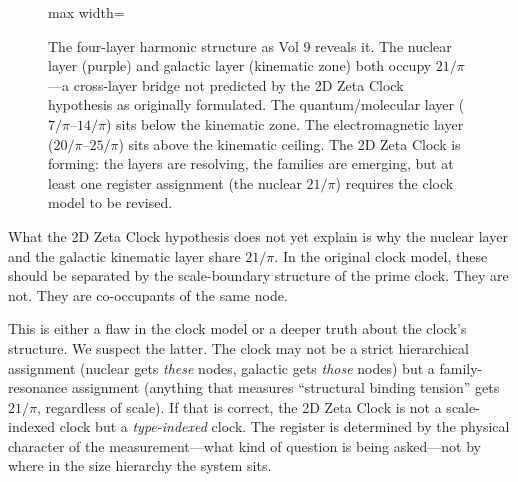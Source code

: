 \documentclass[11pt, letterpaper, openany]{book}
\begin{document}
\begin{figure}[H]
\begin{adjustbox}{max width=\textwidth}
\end{adjustbox}
\caption{The four-layer harmonic structure as Vol 9 reveals it. The nuclear layer
(purple) and galactic layer (kinematic zone) both occupy $21/\pi$---a cross-layer
bridge not predicted by the 2D Zeta Clock hypothesis as originally formulated.
The quantum/molecular layer ($7/\pi$--$14/\pi$) sits below the kinematic zone.
The electromagnetic layer ($20/\pi$--$25/\pi$) sits above the kinematic ceiling.
The 2D Zeta Clock is forming: the layers are resolving, the families are emerging,
but at least one register assignment (the nuclear $21/\pi$) requires the clock
model to be revised.}
\label{fig:four_layer}
\end{figure}

What the 2D Zeta Clock hypothesis does not yet explain is why the nuclear layer
and the galactic kinematic layer share $21/\pi$. In the original clock model,
these should be separated by the scale-boundary structure of the prime clock.
They are not. They are co-occupants of the same node.

This is either a flaw in the clock model or a deeper truth about the clock's
structure. We suspect the latter. The clock may not be a strict hierarchical
assignment (nuclear gets \emph{these} nodes, galactic gets \emph{those} nodes)
but a family-resonance assignment (anything that measures ``structural binding
tension'' gets $21/\pi$, regardless of scale). If that is correct, the 2D Zeta
Clock is not a scale-indexed clock but a \emph{type-indexed} clock. The
register is determined by the physical character of the measurement---what
kind of question is being asked---not by where in the size hierarchy the system
sits.
\end{document}
